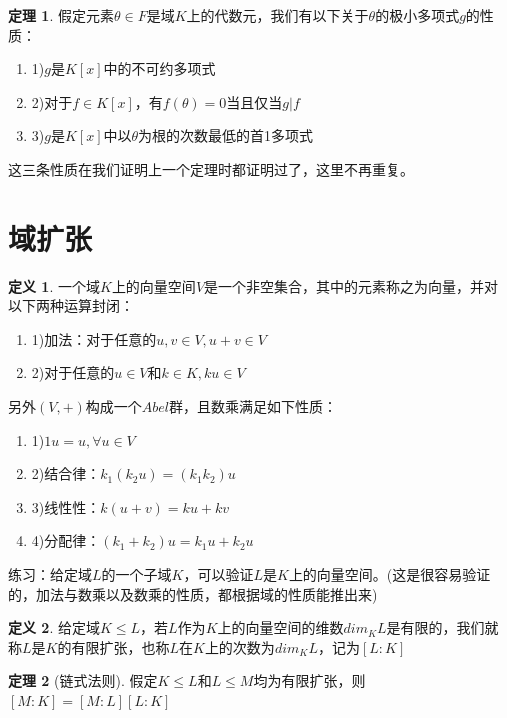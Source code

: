 \documentclass[12pt, a4paper, oneside]{ctexart}
\theoremstyle{definition}
\newtheorem*{definition}{定义}
\newtheorem*{theorem}{定理}
\begin{document}
\begin{theorem}
假定元素$\theta\in F$是域$K$上的代数元，我们有以下关于$\theta$的极小多项式$g$的性质：

\begin{enumerate}
\item 1)$g$是$K[x]$中的不可约多项式
\item 2)对于$f\in K[x]$，有$f(\theta)=0$当且仅当$g|f$
\item 3)$g$是$K[x]$中以$\theta$为根的次数最低的首1多项式
\end{enumerate}
\end{theorem}

这三条性质在我们证明上一个定理时都证明过了，这里不再重复。

\section*{域扩张}

\begin{definition}
一个域$K$上的向量空间$V$是一个非空集合，其中的元素称之为向量，并对以下两种运算封闭：

\begin{enumerate}
\item 1)加法：对于任意的$u,v\in V,u+v\in V$
\item 2)对于任意的$u\in V$和$k\in K,ku\in V$
\end{enumerate}

另外$(V,+)$构成一个$Abel$群，且数乘满足如下性质：

\begin{enumerate}
\item 1)$1u=u,\forall u\in V$
\item 2)结合律：$k_1(k_2u)=(k_1k_2)u$
\item 3)线性性：$k(u+v)=ku+kv$
\item 4)分配律：$(k_1+k_2)u=k_1u+k_2u$
\end{enumerate}
\end{definition}

练习：给定域$L$的一个子域$K$，可以验证$L$是$K$上的向量空间。(这是很容易验证的，加法与数乘以及数乘的性质，都根据域的性质能推出来)

\begin{definition}
给定域$K\leqslant L$，若$L$作为$K$上的向量空间的维数$dim_KL$是有限的，我们就称$L$是$K$的有限扩张，也称$L$在$K$上的次数为$dim_KL$，记为$[L:K]$
\end{definition}

\begin{theorem}[链式法则]
假定$K\leqslant L$和$L\leqslant M$均为有限扩张，则$[M:K]=[M:L][L:K]$
\end{theorem}
\end{document}

